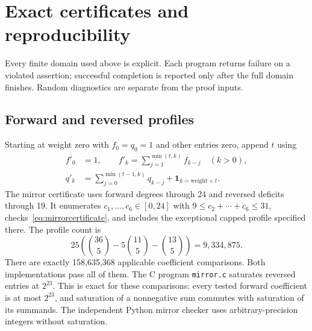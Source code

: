\section{Exact certificates and reproducibility}\label{sec:certificates}
Every finite domain used above is explicit. Each program returns failure on a violated assertion; successful completion is reported only after the full domain finishes. Random diagnostics are separate from the proof inputs.

\subsection{Forward and reversed profiles}
Starting at weight zero with $f_0=q_0=1$ and other entries zero, append $t$ using
\begin{equation}\label{eq:profilealgorithm}
 \begin{split}
 f'_0&=1,\qquad f'_k=\sum_{j=1}^{\min(t,k)}f_{k-j}\quad(k>0),\\
 q'_k&=\sum_{j=0}^{\min(t-1,k)}q_{k-j}+\mathbf1_{k=\mathrm{weight}+t}.
 \end{split}
\end{equation}
The mirror certificate uses forward degrees through 24 and reversed deficits through 19. It enumerates $c_1,\ldots,c_6\in[0,24]$ with $9\le c_2+\cdots+c_6\le31$, checks~\eqref{eq:mirrorcertificate}, and includes the exceptional capped profile specified there. The profile count is
\[
 25\left(\binom{36}{5}-5\binom{11}{5}-\binom{13}{5}\right)=9,334,875.
\]
There are exactly 158,635,368 applicable coefficient comparisons. Both implementations pass all of them. The C program \texttt{mirror.c} saturates reversed entries at $2^{23}$. This is exact for these comparisons: every tested forward coefficient is at most $2^{23}$, and saturation of a nonnegative sum commutes with saturation of its summands. The independent Python mirror checker uses arbitrary-precision integers without saturation.

